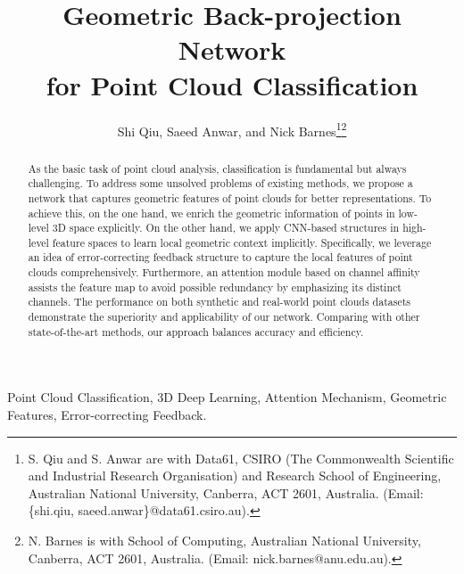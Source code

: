 \documentclass[journal,twoside]{IEEEtran}
\begin{document}
\title{Geometric Back-projection Network \\for Point Cloud Classification}

\author{Shi Qiu,
        Saeed Anwar,
        and Nick Barnes\thanks{S. Qiu and S. Anwar are with Data61, CSIRO (The Commonwealth Scientific and Industrial Research Organisation) and Research School of Engineering, Australian National University, Canberra, ACT 2601, Australia. (Email: \{shi.qiu, saeed.anwar\}@data61.csiro.au).}\thanks{N. Barnes is with School of Computing, Australian National University, Canberra, ACT 2601, Australia. (Email: nick.barnes@anu.edu.au).}}

\maketitle

\begin{abstract}
As the basic task of point cloud analysis, classification is fundamental but always challenging. To address some unsolved problems of existing methods, we propose a network that captures geometric features of point clouds for better representations. To achieve this, on the one hand, we enrich the geometric information of points in low-level 3D space explicitly. On the other hand, we apply CNN-based structures in high-level feature spaces to learn local geometric context implicitly. Specifically, we leverage an idea of error-correcting feedback structure to capture the local features of point clouds comprehensively. Furthermore, an attention module based on channel affinity assists the feature map to avoid possible redundancy by emphasizing its distinct channels. The performance on both synthetic and real-world point clouds datasets demonstrate the superiority and applicability of our network. Comparing with other state-of-the-art methods, our approach balances accuracy and efficiency.
\end{abstract}

\begin{IEEEkeywords}
Point Cloud Classification, 3D Deep Learning, Attention Mechanism, Geometric Features, Error-correcting Feedback.
\end{IEEEkeywords}

\IEEEpeerreviewmaketitle
\end{document}
